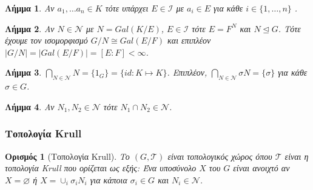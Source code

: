 \documentclass{beamer}
\newcommand {\tl}{\textlatin}
\newtheorem{lhmma}{Λήμμα}
\newtheorem*{defn}{Ορισμός}
\begin{document}
\begin{frame}
    \begin{lhmma}
     Aν $a_1 , \ldots a_n \in K$ τότε υπάρχει $E \in \mathcal{I}$ με $a_i \in E$ για κάθε $i \in \{1,\dots, n\}$ .
    \end{lhmma}
    \pause %
    \begin{lhmma}
    Αν $N \in \mathcal{N}$ με $N = Gal(K/E)$, $E \in \mathcal{I}$ τότε $E=F^N$ και $N\unlhd G$. Τότε έχουμε τον ισομορφισμό $G/N \cong Gal(E/F)$ και επιπλέον $|G/N| = |Gal(E/F)| = [E:F] < \infty$.

    \end{lhmma} %
    \pause
    \begin{lhmma}
        $\bigcap_{N \in \mathcal{N}} N= \{1_G \} = \{ id: K \mapsto K \}$. Επιπλέον, $\bigcap_{N \in \mathcal{N}} \sigma N = \{\sigma \}$ για κάθε $\sigma \in G$.
    \end{lhmma}%
    
    
\end{frame}

\begin{frame}
    \begin{lhmma}
    Αν $N_1, N_2 \in \mathcal{N}$ τότε $N_1 \cap N_2 \in \mathcal{N}$.
    \end{lhmma}
\end{frame}%


\begin{frame}
    \frametitle{Τοπολογία \tl{Krull}}
    \begin{defn}[Τοπολογία \tl{Krull}] Το $(G,\mathcal{T})$ είναι τοπολογικός χώρος όπου $\mathcal{T}$ είναι η τοπολογία \tl{Krull} που ορίζεται ως εξής:
Ένα υποσύνολο $X$ του $G$ είναι ανοιχτό αν $X=\varnothing$ ή $X= \cup_i \sigma_i N_i$ για κάποια $\sigma_i \in G$ και $N_i \in \mathcal{N}$.
\end{defn}
\end{frame}
\end{document}
